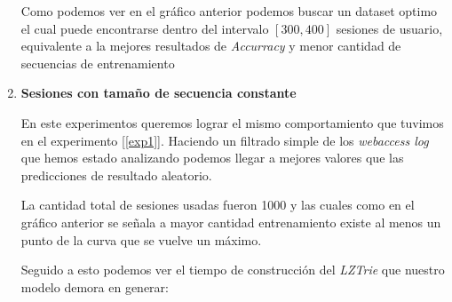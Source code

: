 \begin{enumerate}
	
	Como podemos ver en el gráfico anterior podemos buscar un dataset optimo el cual puede encontrarse dentro del intervalo $ [ 300,400 ]$ sesiones de usuario, equivalente a la mejores resultados de \emph{Accurracy} y menor cantidad de secuencias de entrenamiento


	\item \label{exp4}	
	\textbf{Sesiones con tamaño de secuencia constante}

	En este experimentos queremos lograr el mismo comportamiento que tuvimos en el experimento [\ref{exp1}]. Haciendo un filtrado simple de los \emph{webaccess log } que hemos estado analizando podemos llegar a mejores valores que las predicciones de resultado aleatorio.


	
	La cantidad total de sesiones usadas fueron 1000 y las cuales como en el gráfico anterior se señala a mayor cantidad entrenamiento existe al menos un punto de la curva que se vuelve un máximo.


	Seguido a esto podemos ver el tiempo de construcción del \emph{LZTrie} que nuestro modelo demora en generar:
	


\end{enumerate}
